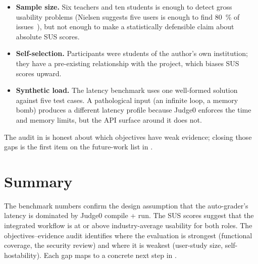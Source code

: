 \begin{itemize}
  \item \textbf{Sample size.} Six teachers and ten students is enough to detect gross usability problems (Nielsen suggests five users is enough to find 80~\% of issues~\cite{nielsen-heuristics}), but not enough to make a statistically defensible claim about absolute SUS scores.
  \item \textbf{Self-selection.} Participants were students of the author's own institution; they have a pre-existing relationship with the project, which biases SUS scores upward.
  \item \textbf{Synthetic load.} The latency benchmark uses one well-formed solution against five test cases. A pathological input (an infinite loop, a memory bomb) produces a different latency profile because Judge0 enforces the time and memory limits, but the API surface around it does not.
\end{itemize}

The audit in  is honest about which objectives have weak evidence; closing those gaps is the first item on the future-work list in .

\section{Summary}

The benchmark numbers confirm the design assumption that the auto-grader's latency is dominated by Judge0 compile + run. The SUS scores suggest that the integrated workflow is at or above industry-average usability for both roles. The objectives--evidence audit identifies where the evaluation is strongest (functional coverage, the security review) and where it is weakest (user-study size, self-hostability). Each gap maps to a concrete next step in .
